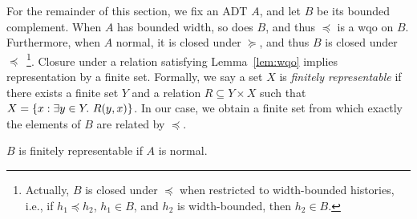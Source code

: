 For the remainder of this section, we fix an ADT $A$, and let $B$ be its bounded
complement. When $A$ has bounded width, so does $B$, and thus $\preceq$ is a wqo
on $B$. Furthermore, when $A$ normal, it is closed under $\succeq$, and thus $B$
is closed under $\preceq$~\footnote{Actually, $B$ is closed under $\preceq$ when
restricted to width-bounded histories, i.e., if $h_1 \preceq h_2$, $h_1 \in B$,
and $h_2$ is width-bounded, then $h_2\in B$.}. Closure under a relation
satisfying Lemma~\ref{lem:wqo} implies representation by a finite set. Formally,
we say a set $X$ is \emph{finitely representable} if there exists a finite set
$Y$ and a relation $R \subseteq Y \times X$ such that $X = {\{{ x : \exists
y\in Y.\ R(y,x) }\}}$. In our case, we obtain a finite set from which exactly the
elements of $B$ are related by $\preceq$.

\begin{lemma}

  $B$ is finitely representable if $A$ is normal.

\end{lemma}

